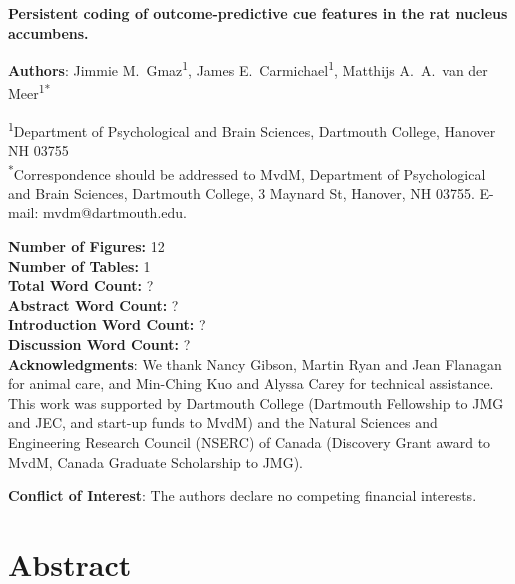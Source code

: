 \documentclass[11pt]{article}
\begin{document}
{\Large\bf Persistent coding of outcome-predictive cue features in the
  rat nucleus accumbens.}

{\bf Authors}: Jimmie M.\ Gmaz\textsuperscript{1}, James
E.\ Carmichael\textsuperscript{1}, Matthijs A.\ A.\ van der
Meer\textsuperscript{1*}

\textsuperscript{1}Department of Psychological and Brain Sciences,
Dartmouth College, Hanover NH
03755\\ 

\textsuperscript{*}Correspondence should be addressed to MvdM,
Department of Psychological and Brain Sciences, Dartmouth College, 3
Maynard St, Hanover, NH 03755. E-mail: {\sffamily mvdm@dartmouth.edu}.

\textbf{Number of Figures:} 12\\
\textbf{Number of Tables:} 1\\
\textbf{Total Word Count:} ?\\
\textbf{Abstract Word Count:} ?\\
\textbf{Introduction Word Count:} ?\\
\textbf{Discussion Word Count:} ?\\

\textbf{Acknowledgments}: We thank Nancy Gibson, Martin Ryan and Jean
Flanagan for animal care, and Min-Ching Kuo and
Alyssa Carey for technical assistance. This work was supported by
Dartmouth College (Dartmouth Fellowship to JMG and JEC, and start-up funds to
MvdM) and the Natural Sciences and Engineering Research Council
(NSERC) of Canada (Discovery Grant award to MvdM, Canada Graduate
Scholarship to JMG).

\textbf{Conflict of Interest}: The authors declare no competing
financial interests.\\

\newpage
\linenumbers

\section*{Abstract}
\end{document}
